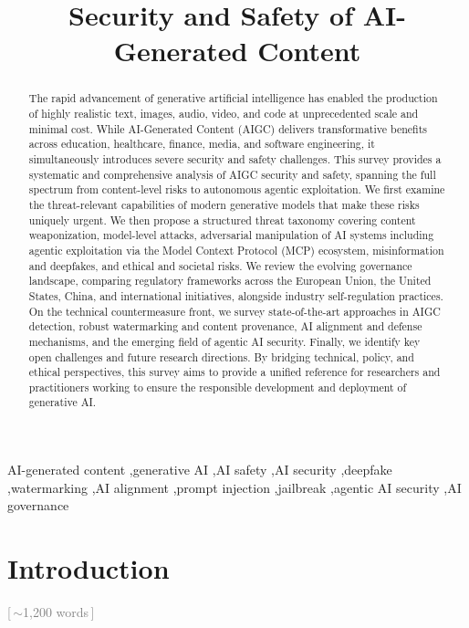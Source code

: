 \documentclass[preprint,12pt]{elsarticle}
\newcommand{\wordcount}[1]{\hfill\textcolor{gray}{\small[\,#1\,]}}
\begin{document}
\begin{frontmatter}

\title{Security and Safety of AI-Generated Content}



\begin{abstract}
The rapid advancement of generative artificial intelligence has enabled the production of highly realistic text, images, audio, video, and code at unprecedented scale and minimal cost. While AI-Generated Content (AIGC) delivers transformative benefits across education, healthcare, finance, media, and software engineering, it simultaneously introduces severe security and safety challenges. This survey provides a systematic and comprehensive analysis of AIGC security and safety, spanning the full spectrum from content-level risks to autonomous agentic exploitation. We first examine the threat-relevant capabilities of modern generative models that make these risks uniquely urgent. We then propose a structured threat taxonomy covering content weaponization, model-level attacks, adversarial manipulation of AI systems including agentic exploitation via the Model Context Protocol (MCP) ecosystem, misinformation and deepfakes, and ethical and societal risks. We review the evolving governance landscape, comparing regulatory frameworks across the European Union, the United States, China, and international initiatives, alongside industry self-regulation practices. On the technical countermeasure front, we survey state-of-the-art approaches in AIGC detection, robust watermarking and content provenance, AI alignment and defense mechanisms, and the emerging field of agentic AI security. Finally, we identify key open challenges and future research directions. By bridging technical, policy, and ethical perspectives, this survey aims to provide a unified reference for researchers and practitioners working to ensure the responsible development and deployment of generative AI.
\end{abstract}

\begin{keyword}
AI-generated content \sep generative AI \sep AI safety \sep AI security \sep deepfake \sep watermarking \sep AI alignment \sep prompt injection \sep jailbreak \sep agentic AI security \sep AI governance
\end{keyword}

\end{frontmatter}

\section{Introduction} \wordcount{$\sim$1,200 words}
\label{sec:introduction}
\end{document}

